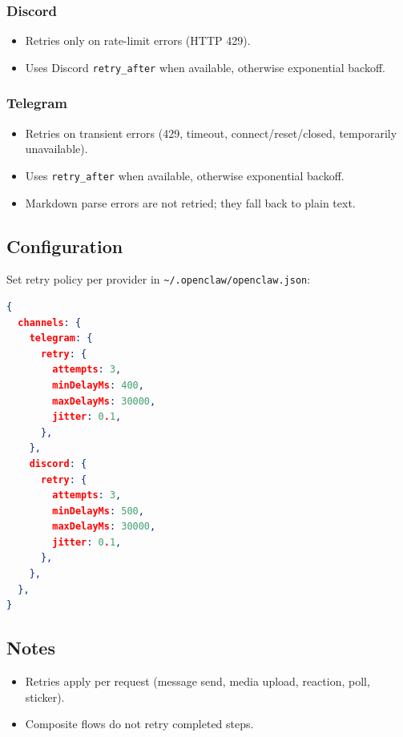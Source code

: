 \subsubsection{Discord}


\begin{itemize}
  \item Retries only on rate-limit errors (HTTP 429).
  \item Uses Discord \texttt{retry\_after} when available, otherwise exponential backoff.
\end{itemize}


\subsubsection{Telegram}


\begin{itemize}
  \item Retries on transient errors (429, timeout, connect/reset/closed, temporarily unavailable).
  \item Uses \texttt{retry\_after} when available, otherwise exponential backoff.
  \item Markdown parse errors are not retried; they fall back to plain text.
\end{itemize}


\subsection{Configuration}


Set retry policy per provider in \texttt{\textasciitilde{}/.openclaw/openclaw.json}:

\begin{lstlisting}[language=json]
{
  channels: {
    telegram: {
      retry: {
        attempts: 3,
        minDelayMs: 400,
        maxDelayMs: 30000,
        jitter: 0.1,
      },
    },
    discord: {
      retry: {
        attempts: 3,
        minDelayMs: 500,
        maxDelayMs: 30000,
        jitter: 0.1,
      },
    },
  },
}
\end{lstlisting}


\subsection{Notes}


\begin{itemize}
  \item Retries apply per request (message send, media upload, reaction, poll, sticker).
  \item Composite flows do not retry completed steps.
\end{itemize}



